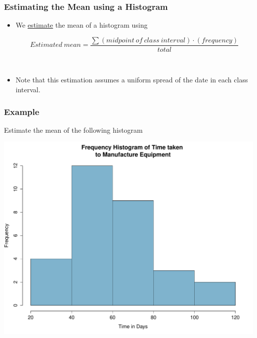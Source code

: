 \documentclass[xcolor=svgnames, compress]{beamer}
\begin{document}

\begin{frame}%
\frametitle{Estimating the Mean using a Histogram}

\begin{itemize}
\justifying
\item	We \underline{estimate} the mean of a histogram using


\begin{equation*}
Estimated ~ mean = \frac{ \sum (mid point ~  of ~ class ~ interval) \cdot (frequency) }{total}
\end{equation*}

\hfill\\
\item	Note that this estimation assumes a uniform spread of the date in each class interval.
\end{itemize}

\end{frame}




\begin{frame}[t]
\frametitle{Example}

\vspace{-1.0cm}

\small
Estimate the mean of the following histogram

\vspace*{-0.4cm}
\begin{center}
\includegraphics[scale=0.18]{freq_hist.pdf} 
\end{center}

\end{frame}
\end{document}
